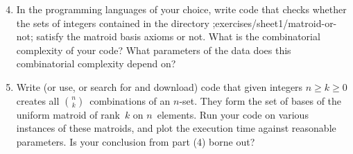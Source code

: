 \documentclass[11pt]{amsart}
\newcommand{\defn}[1]{{\color{blue}#1}}
\begin{document}
\bigskip
\begin{enumerate}
  \setcounter{enumi}{3}
\item
  In the programming languages of your choice,
  write code that checks whether the sets of integers contained in the directory ;exercises/sheet1/matroid-or-not; satisfy the matroid basis axioms or not.
  What is the combinatorial complexity of your code?
  What parameters of the data does this combinatorial complexity depend on?

\item
  Write (or use, or search for and download) code that given integers $n\ge k\ge0$ creates all $\binom{n}{k}$~combinations of an $n$-set.
  They form the set of bases of the \defn{uniform matroid of rank~$k$ on $n$~elements}.
  Run your code on various instances of these matroids, and plot the execution time against reasonable parameters.
  Is your conclusion from part (4) borne out?
\end{enumerate}
\end{document}
